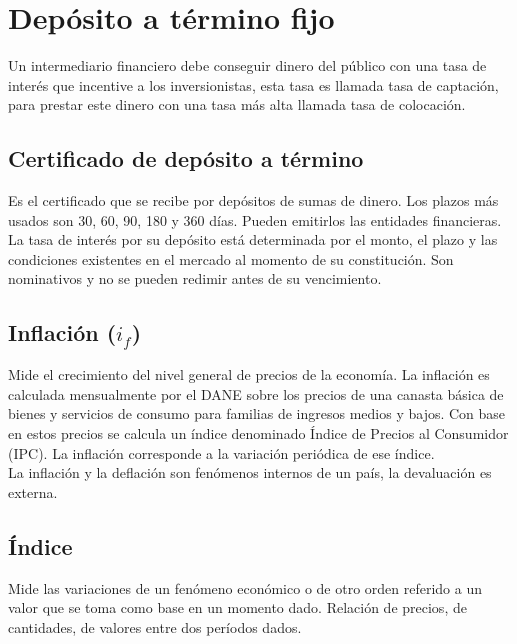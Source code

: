 \section{Depósito a término fijo}

Un intermediario financiero debe conseguir dinero del público con una tasa de interés que incentive a los inversionistas, esta tasa es llamada tasa de captación, para prestar este dinero con una tasa más alta llamada tasa de colocación.

\subsection{Certificado de depósito a término}
Es el certificado que se recibe por depósitos de sumas de dinero. Los plazos más usados son 30, 60, 90, 180 y 360 días. Pueden emitirlos las entidades financieras. La tasa de interés por su depósito está determinada por el monto, el plazo y las condiciones existentes en el mercado al momento de su constitución. Son nominativos y no se pueden redimir antes de su vencimiento.\\






\subsection{Inflación ($i_f$)}
Mide el crecimiento del nivel general de precios de la economía. La inflación es calculada mensualmente por el DANE sobre los precios de una canasta básica de bienes y servicios de consumo para familias de ingresos medios y bajos. Con base en estos precios se calcula un índice denominado Índice de Precios al Consumidor (IPC). La inflación corresponde a la variación periódica de ese índice.\\
La inflación y la deflación son fenómenos internos de un país, la devaluación es externa.

\subsection{Índice}
Mide las variaciones de un fenómeno económico o de otro orden referido a un valor que se toma como base en un momento dado. Relación de precios, de cantidades, de valores entre dos períodos dados.


